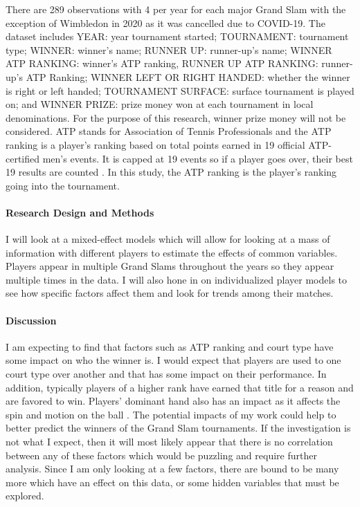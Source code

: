 \documentclass[12pt]{article}
\begin{document}
There are 289 observations with 4 per year for each major Grand Slam with the exception of Wimbledon in 2020 as it was cancelled due to COVID-19. The dataset includes YEAR: year tournament started; TOURNAMENT: tournament type; WINNER: winner's name; RUNNER UP: runner-up's name; WINNER ATP RANKING: winner's ATP ranking, RUNNER UP ATP RANKING: runner-up's ATP Ranking; WINNER LEFT OR RIGHT HANDED: whether the winner is right or left handed; TOURNAMENT SURFACE: surface tournament is played on; and WINNER PRIZE: prize money won at each tournament in local denominations. For the purpose of this research, winner prize money will not be considered. ATP stands for Association of Tennis Professionals and the ATP ranking is a player's ranking based on total points earned in 19 official ATP-certified men's events. It is capped at 19 events so if a player goes over, their best 19 results are counted \citet{Nag2022Tennis}. In this study, the ATP ranking is the player's ranking going into the tournament.

\paragraph{Research Design and Methods}

I will look at a mixed-effect models which will allow for looking at a mass of information with different players to estimate the effects of common variables. Players appear in multiple Grand Slams throughout the years so they appear multiple times in the data. I will also hone in on individualized player models to see how specific factors affect them and look for trends among their matches.

\paragraph{Discussion}
I am expecting to find that factors such as ATP ranking and court type have some impact on who the winner is. I would expect that players are used to one court type over another and that has some impact on their performance. In addition, typically players of a higher rank have earned that title for a reason and are favored to win. Players' dominant hand also has an impact as it affects the spin and motion on the ball \citet{Jurejko2018French}. The potential impacts of my work could help to better predict the winners of the Grand Slam tournaments. If the investigation is not what I expect, then it will most likely appear that there is no correlation between any of these factors which would be puzzling and require further analysis. Since I am only looking at a few factors, there are bound to be many more which have an effect on this data, or some hidden variables that must be explored.
\end{document}
